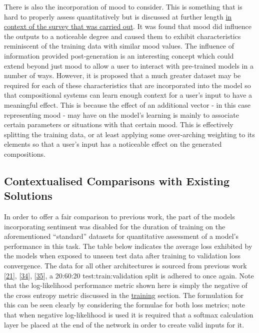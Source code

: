 \documentclass[12pt,]{article}
\begin{document}
There is also the incorporation of mood to consider. This is something
that is hard to properly assess quantitatively but is discussed at
further length \protect\hyperlink{qualitativesurveyingassessment}{in
context of the survey that was carried out}. It was found that mood did
influence the outputs to a noticeable degree and caused them to exhibit
characteristics reminiscent of the training data with similar mood
values. The influence of information provided post-generation is an
interesting concept which could extend beyond just mood to allow a user
to interact with pre-trained models in a number of ways. However, it is
proposed that a much greater dataset may be required for each of these
characteristics that are incorporated into the model so that
compositional systems can learn enough context for a user's input to
have a meaningful effect. This is because the effect of an additional
vector - in this case representing mood - may have on the model's
learning is mainly to associate certain parameters or situations with
that certain mood. This is effectively splitting the training data, or
at least applying some over-arching weighting to its elements so that a
user's input has a noticeable effect on the generated compositions.

\hypertarget{contextualised-comparisons-with-existing-solutions}{%
\subsection{Contextualised Comparisons with Existing
Solutions}\label{contextualised-comparisons-with-existing-solutions}}

In order to offer a fair comparison to previous work, the part of the
models incorporating sentiment was disabled for the duration of training
on the aforementioned ``standard'' datasets for quantitative assessment
of a model's performance in this task. The table below indicates the
average loss exhibited by the models when exposed to unseen test data
after training to validation loss convergence. The data for all other
architectures is sourced from previous work
{[}\protect\hyperlink{ref-boulanger2012modeling}{21}{]},
{[}\protect\hyperlink{ref-vohra2015modeling}{34}{]},
{[}\protect\hyperlink{ref-johnson2017generating}{35}{]}, a 20:60:20
test:train:validation split is adhered to once again. Note that the
log-likelihood performance metric shown here is simply the negative of
the cross entropy metric discussed in the
\protect\hyperlink{training}{training} section. The formulation for this
can be seen clearly by considering the formulae for both loss metrics;
note that when negative log-likelihood is used it is required that a
softmax calculation layer be placed at the end of the network in order
to create valid inputs for it.
\end{document}
